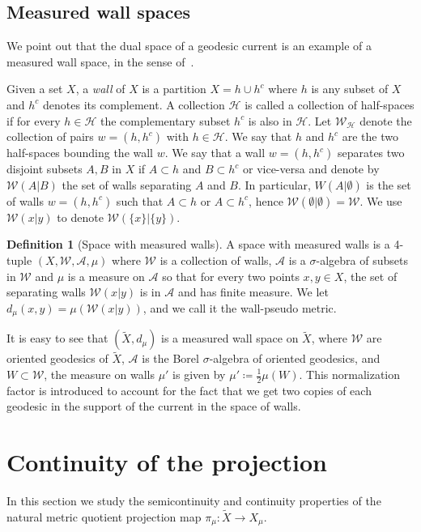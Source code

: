 \documentclass[12pt,article]{amsart}
\numberwithin{equation}{section}
\numberwithin{figure}{section}
\theoremstyle{definition}
\newtheorem{definition}[equation]{Definition}
\theoremstyle{plain}
\newcommand*{\wt}[1]{\widetilde{#1}}
\begin{document}
 \subsection{Measured wall spaces}

We point out that the dual space of a geodesic current is an example of a measured wall space, in the sense of~\cite{CFV04:MeasuredWall}.

 Given a set $X$, a \emph{wall} of $X$ is a partition $X = h \cup h^c$ where $h$ is any subset of $X$ and $h^c$ denotes its complement. A collection $\mathcal{H}$ is called a collection of half-spaces if for every $h \in \mathcal{H}$ the complementary subset $h^c$ is also in $\mathcal{H}$. Let $\mathcal{W}_{\mathcal{H}}$ denote the collection of pairs $w=(h,h^c)$ with $h \in \mathcal{H}$. We say that $h$ and $h^c$ are the two half-spaces bounding the wall $w$.
 We say that a wall $w=(h,h^c)$ separates two disjoint subsets $A,B$ in $X$ if $A \subset h$ and $B \subset h^c$ or vice-versa and denote by $\mathcal{W}(A|B)$ the set of walls separating $A$ and $B$. In particular, $W(A| \emptyset)$ is the set of walls $w=(h,h^c)$ such that $A \subset h$ or $A \subset h^c$, hence $\mathcal{W}(\emptyset | \emptyset)=\mathcal{W}$.
 We use $\mathcal{W}(x|y)$ to denote $\mathcal{W}(\{ x \} | \{ y \})$.
 
 \begin{definition}[Space with measured walls]
 A space with measured walls is a 4-tuple $(X,\mathcal{W},\mathcal{A},\mu)$ where $\mathcal{W}$ is a collection of walls, $\mathcal{A}$ is a $\sigma$-algebra of subsets in $\mathcal{W}$ and $\mu$ is a measure on $\mathcal{A}$ so that for every two points $x, y \in X$, the set of separating walls $\mathcal{W}(x|y)$ is in $\mathcal{A}$ and has finite measure. We let $d_{\mu}(x,y)=\mu(\mathcal{W}(x|y))$, and we call it the wall-pseudo metric.
 \end{definition}

It is easy to see that $(\wt{X},d_{\mu})$ is a measured wall space on $\wt{X}$, where $\mathcal{W}$ are oriented geodesics of $\wt{X}$, $\mathcal{A}$ is the Borel $\sigma$-algebra of oriented geodesics, and $W \subset \mathcal{W}$, the measure on walls $\mu'$ is given by $\mu' \coloneqq \frac{1}{2}\mu(W)$. This normalization factor is introduced to account for the fact that we get two copies of each geodesic in the support of the current in the space of walls.
 

 
 \section{Continuity of the projection}
\label{sec:semicontinuity}
In this section we study the semicontinuity and continuity properties of the natural metric quotient projection map $\pi_{\mu} \colon \wt{X} \to X_{\mu}$.
\end{document}
